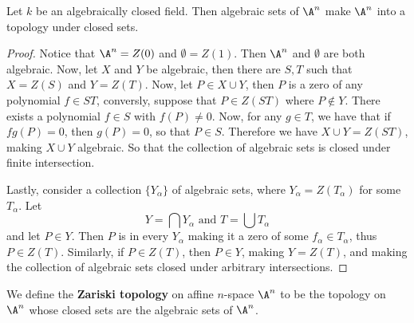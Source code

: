 \begin{lemma}\label{lemma_1.1.1}
    Let $k$ be an algebraically closed field. Then algebraic sets of $\A^n$ make
     $\A^n$ into a topology under closed sets.
\end{lemma}
\begin{proof}
    Notice that $\A^n=Z(0)$ and $\emptyset=Z(1)$. Then $\A^n$ and $\emptyset$
    are both algebraic. Now, let  $X$ and  $Y$ be algebraic, then there are $S,T$
    such that  $X=Z(S)$ and $Y=Z(T)$. Now, let $P \in X \cup Y$, then $P$ is a
    zero of any polynomial $f \in ST$, conversly, suppose that $P \in Z(ST)$ where
    $P \notin Y$. There exists a polynomial  $f \in S$ with $f(P) \neq 0$. Now,
    for any $g \in T$, we have that if $fg(P)=0$, then $g(P)=0$, so that $P \in
    S$. Therefore we have  $X \cup Y=Z(ST)$, making $X \cup Y$ algebraic. So that
    the collection of algebraic sets is closed under finite intersection.

    Lastly, consider a collection $\{Y_\alpha\}$ of algebraic sets, where
    $Y_\alpha=Z(T_\alpha)$ for some $T_\alpha$. Let
    \begin{equation*}
        Y=\bigcap{Y_\alpha} \text{ and } T=\bigcup{T_\alpha}
    \end{equation*}
    and let $P \in Y$. Then $P$ is in every $Y_\alpha$ making it a zero of some
    $f_\alpha \in T_\alpha$, thus  $P \in Z(T)$. Similarly, if $P \in Z(T)$, then
    $P \in Y$, making $Y=Z(T)$, and making the collection of algebraic sets
    closed under arbitrary intersections.
\end{proof}

\begin{definition}
    We define the \textbf{Zariski topology} on affine $n$-space  $\A^n$ to be
    the topology on $\A^n$ whose closed sets are the algebraic sets of $\A^n$.
\end{definition}

